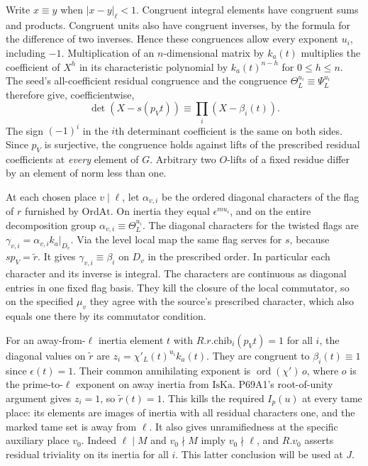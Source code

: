 Write $x\equiv y$ when $|x-y|_\ell<1$. Congruent integral
elements have congruent sums and products. Congruent units also
have congruent inverses, by the formula for the difference
of two inverses. Hence these congruences allow every exponent
$u_i$, including $-1$. Multiplication of an $n$-dimensional
matrix by $k_a(t)$ multiplies the coefficient of $X^h$ in its
characteristic polynomial by $k_a(t)^{n-h}$ for $0\le h\le n$.
The seed's all-coefficient residual congruence and the congruence
$\Theta_L^{u_i}\equiv\Psi_L^{u_i}$ therefore give, coefficientwise,
\[
        \det(X-s(p_Vt))\equiv\prod_i(X-\beta_i(t)).
\]
The sign $(-1)^i$ in the $i$th determinant coefficient is the
same on both sides. Since $p_V$ is surjective, the congruence
holds against lifts of the prescribed residual coefficients at
\emph{every} element of $G$. Arbitrary two $O$-lifts of a fixed
residue differ by an element of norm less than one.

At each chosen place $v\mid\ell$, let $\alpha_{v,i}$ be the
ordered diagonal characters of the flag of $r$ furnished by
$\mathrm{OrdAt}$. On inertia they equal $\epsilon^{m u_i}$,
and on the entire decomposition group
$\alpha_{v,i}\equiv\Theta_L^{u_i}$. The diagonal characters for
the twisted flags are
$\gamma_{v,i}=\alpha_{v,i} k_a|_{D_v}$. Via the level local map
the same flag serves for $s$, because $s p_V=\widetilde r$.
It gives $\gamma_{v,i}\equiv\beta_i$ on $D_v$ in the prescribed
order. In particular each character and its inverse is integral.
The characters are continuous as diagonal entries in one fixed
flag basis. They kill the closure of the local commutator, so on
the specified $\mu_v$ they agree with the source's prescribed
character, which also equals one there by its commutator condition.

For an away-from-$\ell$ inertia element $t$ with
$R.r.\mathrm{chib}_i(p_Vt)=1$ for all $i$, the diagonal values
on $\widetilde r$ are $z_i=\chi'_L(t)^{u_i} k_a(t)$.
They are congruent to $\beta_i(t)\equiv1$ since $\epsilon(t)=1$.
Their common annihilating exponent is
$\operatorname{ord}(\chi')\,o$, where $o$ is the prime-to-$\ell$
exponent on away inertia from $\mathrm{IsKa}$. P69A1's
root-of-unity argument gives $z_i=1$, so $\widetilde r(t)=1$.
This kills the required $I_p(u)$ at every tame place: its
elements are images of inertia with all residual characters
one, and the marked tame set is away from $\ell$. It also
gives unramifiedness at the specific auxiliary place $v_0$.
Indeed $\ell\mid M$ and $v_0\nmid M$ imply $v_0\nmid\ell$,
and $R.v_0$ asserts residual triviality on its inertia for
all $i$. This latter conclusion will be used at $J$.

